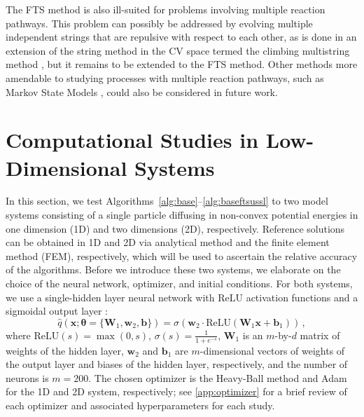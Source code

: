 \documentclass{article}
\numberwithin{equation}{section}
\def\*#1{\mathbf{#1}}
\theoremstyle{definition}
\theoremstyle{remark}
\def\thetab{\boldsymbol{\theta}}
\begin{document}
The FTS method is also ill-suited for problems involving multiple reaction pathways. 
This problem can possibly be addressed by evolving multiple independent strings that are repulsive with respect to each other, as is done in an extension of the string method in the CV space termed the climbing multistring method \cite{shrivastav2019string}, but it remains to be extended to the FTS method.
Other methods more amendable to studying processes with multiple reaction pathways, such as Markov State Models \cite{schutte1999msm,schutte2011markov,bowman2013introduction}, could also be considered in future work. 


\section{Computational Studies in Low-Dimensional Systems} \label{sec:results}
In this section, we test Algorithms~\ref{alg:base}--\ref{alg:baseftsussl} to two model systems consisting of a single particle diffusing in non-convex potential energies in one dimension (1D) and two dimensions (2D), respectively. 
Reference solutions can be obtained in 1D and 2D via analytical method and the finite element method (FEM), respectively, which will be used to ascertain the relative accuracy of the algorithms. 
Before we introduce these two systems, we elaborate on the choice of the neural network, optimizer, and initial conditions. 
For both systems, we use a single-hidden layer neural network with ReLU activation functions and a sigmoidal output layer \cite{hardtrecht}:
\begin{equation}
\hat{q}(\* x;\thetab=\{\* W_1, \* w_2, \* b\}) = \sigma \left(\* w_2 \cdot \mathrm{ReLU}(\* W_1 \* x + \* b_1) \right) \,, \label{eq:simplenn}
\end{equation}
where $\mathrm{ReLU}(s) = \max(0,s)$, $\sigma(s) = \frac{1}{1+e^{-s}}$, $\* W_1$ is an $m$-by-$d$ matrix of weights of the hidden layer, $\* w_2$ and $\* b_1$ are $m$-dimensional vectors of weights of the output layer and biases of the hidden layer, respectively, and the number of neurons is $m=200$. 
The chosen optimizer is the Heavy-Ball method \cite{polyak1964some} and Adam \cite{kingma2014adam} for the 1D and 2D system, respectively; see \cref{app:optimizer} for a brief review of each optimizer and associated hyperparameters for each study. 
\end{document}
